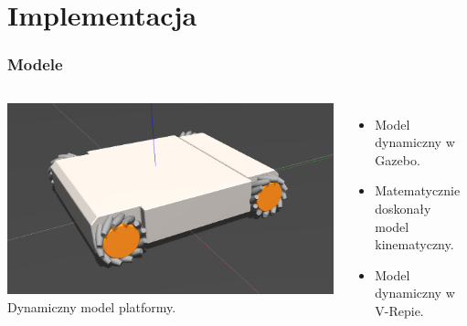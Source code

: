 \documentclass{beamer}
\begin{document}
	\section{Implementacja}
	\begin{frame}
		\frametitle{Modele}
		\begin{columns}[c]
			\centering
			\includegraphics[width=\textwidth]{graphics/model.png} \\
			Dynamiczny model platformy.
			\begin{itemize}
				\item Model dynamiczny w Gazebo.
				\item Matematycznie doskonały model kinematyczny.
				\item Model dynamiczny w V-Repie.
			\end{itemize}
		\end{columns}
	\end{frame}
	
\end{document}
